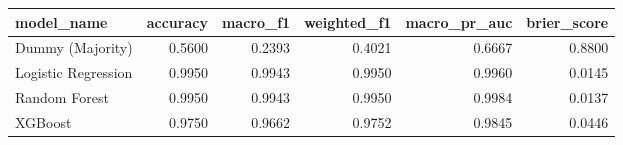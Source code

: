 \begin{tabular}{lrrrrr}
\toprule
model_name & accuracy & macro_f1 & weighted_f1 & macro_pr_auc & brier_score \\
\midrule
Dummy (Majority) & 0.5600 & 0.2393 & 0.4021 & 0.6667 & 0.8800 \\
Logistic Regression & 0.9950 & 0.9943 & 0.9950 & 0.9960 & 0.0145 \\
Random Forest & 0.9950 & 0.9943 & 0.9950 & 0.9984 & 0.0137 \\
XGBoost & 0.9750 & 0.9662 & 0.9752 & 0.9845 & 0.0446 \\
\bottomrule
\end{tabular}
